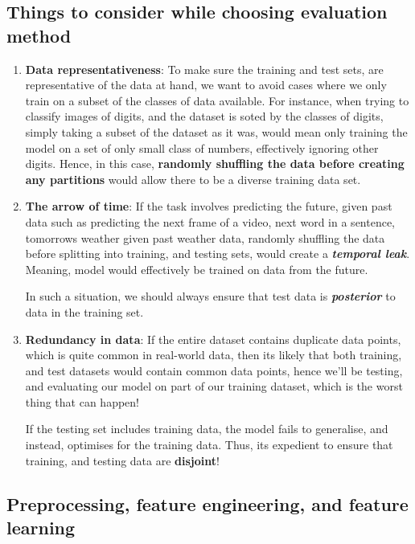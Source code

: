 \documentclass[12pt, a4paper]{article}
\begin{document}
\subsection{Things to consider while choosing evaluation method}
\begin{enumerate}
   \item \textbf{Data representativeness}: To make sure the training and test sets,
   are representative of the data at hand, we want to avoid cases where we only train 
   on a subset of the classes of data available. For instance, when trying to classify 
   images of digits, and the dataset is soted by the classes of digits, simply taking a 
   subset of the dataset as it was, would mean only training the model on a set
   of only small class of numbers, effectively ignoring other digits. Hence, in this case,
   \textbf{randomly shuffling the data before creating any partitions} would allow there to be a diverse
   training data set.
   \item \textbf{The arrow of time}: If the task involves predicting the future,
   given past data such as predicting the next frame of a video, next word in a sentence,
   tomorrows weather given past weather data, randomly shuffling the data before 
   splitting into training, and testing sets, would create a \textbf{\textit{temporal leak}}.
   Meaning, model would effectively be trained on data from the future. 

   In such a situation, we should always ensure that test data is \textbf{\textit{posterior}}
   to data in the training set.

   \item \textbf{Redundancy in data}: If the entire dataset contains duplicate data points,
   which is quite common in real-world data, then its likely that both training, and test datasets would contain 
   common data points, hence we'll be testing, and evaluating our model on part of our training dataset,
   which is the worst thing that can happen!

   If the testing set includes training data, the model fails to generalise, and instead,
   optimises for the training data. Thus, its expedient to ensure that 
   training, and testing data are \textbf{disjoint}!
\end{enumerate}

\subsection{Preprocessing, feature engineering, and feature learning}
\end{document}
